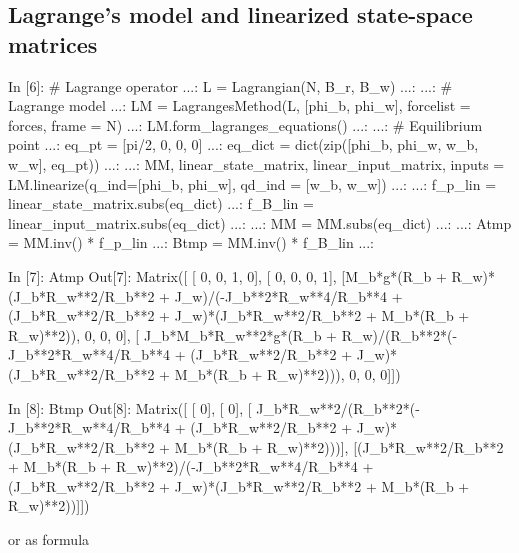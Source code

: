 \subsection{Lagrange's model and linearized state-space matrices}
\begin{code}
In [6]: # Lagrange operator
   ...: L = Lagrangian(N,  B_r,  B_w)
   ...: 
   ...: # Lagrange model
   ...: LM = LagrangesMethod(L, [phi_b, phi_w], forcelist = forces,   frame = N)
   ...: LM.form_lagranges_equations()
   ...: 
   ...: # Equilibrium point
   ...: eq_pt = [pi/2, 0, 0, 0]
   ...: eq_dict = dict(zip([phi_b, phi_w, w_b, w_w], eq_pt))
   ...: 
   ...: MM, linear_state_matrix, linear_input_matrix, inputs = LM.linearize(q_ind=[phi_b, phi_w], qd_ind = [w_b, w_w])
   ...: 
   ...: f_p_lin = linear_state_matrix.subs(eq_dict)
   ...: f_B_lin = linear_input_matrix.subs(eq_dict)
   ...: 
   ...: MM = MM.subs(eq_dict)
   ...: 
   ...: Atmp = MM.inv() * f_p_lin
   ...: Btmp = MM.inv() * f_B_lin
   ...: 

\end{code}

\begin{code}
In [7]: Atmp
Out[7]: 
Matrix([
[                                                                                                                                       0, 0, 1, 0],
[                                                                                                                                       0, 0, 0, 1],
[M_b*g*(R_b + R_w)*(J_b*R_w**2/R_b**2 + J_w)/(-J_b**2*R_w**4/R_b**4 + (J_b*R_w**2/R_b**2 + J_w)*(J_b*R_w**2/R_b**2 + M_b*(R_b + R_w)**2)), 0, 0, 0],
[      J_b*M_b*R_w**2*g*(R_b + R_w)/(R_b**2*(-J_b**2*R_w**4/R_b**4 + (J_b*R_w**2/R_b**2 + J_w)*(J_b*R_w**2/R_b**2 + M_b*(R_b + R_w)**2))), 0, 0, 0]])

In [8]: Btmp
Out[8]: 
Matrix([
[                                                                                                                                    0],
[                                                                                                                                    0],
[                     J_b*R_w**2/(R_b**2*(-J_b**2*R_w**4/R_b**4 + (J_b*R_w**2/R_b**2 + J_w)*(J_b*R_w**2/R_b**2 + M_b*(R_b + R_w)**2)))],
[(J_b*R_w**2/R_b**2 + M_b*(R_b + R_w)**2)/(-J_b**2*R_w**4/R_b**4 + (J_b*R_w**2/R_b**2 + J_w)*(J_b*R_w**2/R_b**2 + M_b*(R_b + R_w)**2))]])
\end{code}

or as formula

